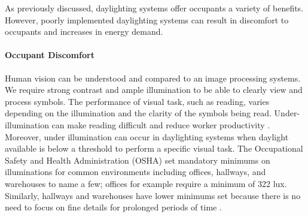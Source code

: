 As previously discussed, daylighting systems offer occupants a variety of benefits. However, poorly implemented daylighting systems can result in discomfort to occupants and increases in energy demand. \\

\paragraph{Occupant Discomfort}

Human vision can be understood and compared to an image processing systems.  We require strong contrast and ample illumination to be able to clearly view and process symbols.  The performance of visual task, such as reading, varies depending on the illumination and the clarity of the symbols being read.  Under-illumination can make reading difficult and reduce worker productivity \cite{boyce}.  Moreover, under illumination can occur in daylighting systems when daylight available is below a threshold to perform a specific visual task.  The Occupational Safety and Health Administration (OSHA) set mandatory minimums on illuminations for common environments including offices, hallways, and warehouses to name a few; offices for example require a minimum of 322 lux. Similarly, hallways and warehouses have lower minimums set because there is no need to focus on fine details for prolonged periods of time \cite{OSHA}. \\

